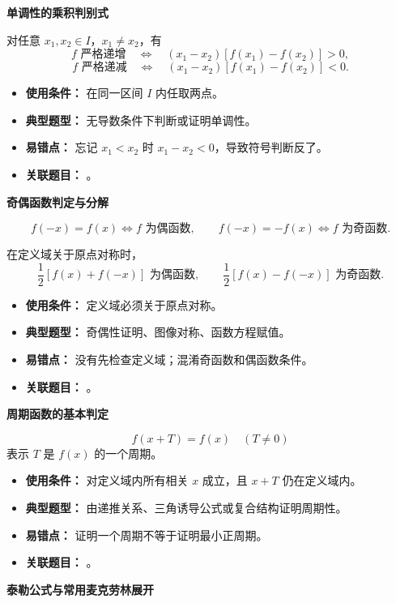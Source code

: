 \begin{knowledgeBox}
\textbf{单调性的乘积判别式}

对任意 \(x_1,x_2\in I\)，\(x_1\ne x_2\)，有
\[
f\text{ 严格递增}
\quad\Longleftrightarrow\quad
(x_1-x_2)[f(x_1)-f(x_2)]>0,
\]
\[
f\text{ 严格递减}
\quad\Longleftrightarrow\quad
(x_1-x_2)[f(x_1)-f(x_2)]<0.
\]

\begin{itemize}
  \item \textbf{使用条件：} 在同一区间 \(I\) 内任取两点。
  \item \textbf{典型题型：} 无导数条件下判断或证明单调性。
  \item \textbf{易错点：} 忘记 \(x_1<x_2\) 时 \(x_1-x_2<0\)，导致符号判断反了。
  \item \textbf{关联题目：} 。
\end{itemize}

\textbf{奇偶函数判定与分解}

\[
f(-x)=f(x)\Longleftrightarrow f\text{ 为偶函数},
\qquad
f(-x)=-f(x)\Longleftrightarrow f\text{ 为奇函数}.
\]

在定义域关于原点对称时，
\[
\frac12[f(x)+f(-x)]\text{ 为偶函数},\qquad
\frac12[f(x)-f(-x)]\text{ 为奇函数}.
\]

\begin{itemize}
  \item \textbf{使用条件：} 定义域必须关于原点对称。
  \item \textbf{典型题型：} 奇偶性证明、图像对称、函数方程赋值。
  \item \textbf{易错点：} 没有先检查定义域；混淆奇函数和偶函数条件。
  \item \textbf{关联题目：} 。
\end{itemize}

\textbf{周期函数的基本判定}

\[
f(x+T)=f(x)\quad (T\ne0)
\]
表示 \(T\) 是 \(f(x)\) 的一个周期。

\begin{itemize}
  \item \textbf{使用条件：} 对定义域内所有相关 \(x\) 成立，且 \(x+T\) 仍在定义域内。
  \item \textbf{典型题型：} 由递推关系、三角诱导公式或复合结构证明周期性。
  \item \textbf{易错点：} 证明一个周期不等于证明最小正周期。
  \item \textbf{关联题目：} 。
\end{itemize}

\textbf{泰勒公式与常用麦克劳林展开}


\end{knowledgeBox}
